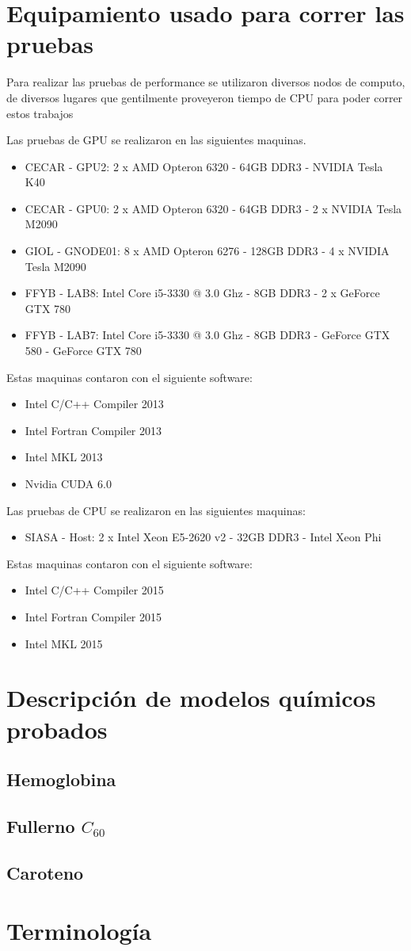 \chapter{Equipamiento usado para correr las pruebas}

Para realizar las pruebas de performance se utilizaron diversos nodos de computo, de diversos lugares que
gentilmente proveyeron tiempo de CPU para poder correr estos trabajos

Las pruebas de GPU se realizaron en las siguientes maquinas.
\begin{itemize}
  \item CECAR - GPU2: 2 x AMD Opteron 6320 - 64GB DDR3 - NVIDIA Tesla K40
  \item CECAR - GPU0: 2 x AMD Opteron 6320 - 64GB DDR3 - 2 x NVIDIA Tesla M2090
  \item GIOL - GNODE01: 8 x AMD Opteron 6276 - 128GB DDR3 - 4 x NVIDIA Tesla M2090
  \item FFYB - LAB8: Intel Core i5-3330 @ 3.0 Ghz - 8GB DDR3 - 2 x GeForce GTX 780
  \item FFYB - LAB7: Intel Core i5-3330 @ 3.0 Ghz - 8GB DDR3 - GeForce GTX 580 - GeForce GTX 780
\end{itemize}

Estas maquinas contaron con el siguiente software:
\begin{itemize}
  \item Intel C/C++ Compiler 2013
  \item Intel Fortran Compiler 2013
  \item Intel MKL 2013
  \item Nvidia CUDA 6.0
\end{itemize}

Las pruebas de CPU se realizaron en las siguientes maquinas:
\begin{itemize}
  \item SIASA - Host: 2 x Intel Xeon E5-2620 v2 - 32GB DDR3 - Intel Xeon Phi
\end{itemize}

Estas maquinas contaron con el siguiente software:
\begin{itemize}
  \item Intel C/C++ Compiler 2015
  \item Intel Fortran Compiler 2015
  \item Intel MKL 2015
\end{itemize}

\chapter{Descripci\'on de modelos qu\'imicos probados}
\section*{Hemoglobina}
\section*{Fullerno $C_{60}$}
\section*{Caroteno}
\chapter{Terminolog\'ia}
